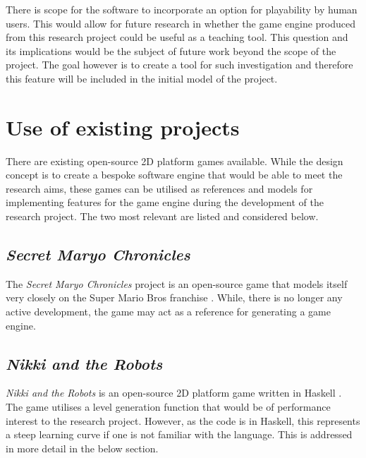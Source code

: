 \documentclass[11pt, a4paper, oneside]{report} %
\begin{document}
There is scope for the software to incorporate an option for playability by human users. This would
allow for future research in whether the game engine produced from this research project could be
useful as a teaching tool. This question and its implications would be the subject of future work
beyond the scope of the project. The goal however is to create a tool for such investigation and
therefore this feature will be included in the initial model of the project.


\section{Use of existing projects}

There are existing open-source 2D platform games available. While the design concept is to create a
bespoke software engine that would be able to meet the research aims, these games can be utilised as
references and models for implementing features for the game engine during the development of the
research project. The two most relevant are listed and considered below.

\subsection{\textit{Secret Maryo Chronicles}}

The \textit{Secret Maryo Chronicles} project is an open-source game that models itself very closely
on the Super Mario Bros franchise \cite{supermaryo}. While, there is no longer any active
development, the game may act as a reference for generating a game engine. 

\subsection{\textit{Nikki and the Robots}}

\textit{Nikki and the Robots} is an open-source 2D platform game written in Haskell \cite{nikki}.
The game utilises a level generation function that would be of performance interest to the research
project. However, as the code is in Haskell, this represents a steep learning curve if one is not
familiar with the language. This is addressed in more detail in the below section.

\end{document}
